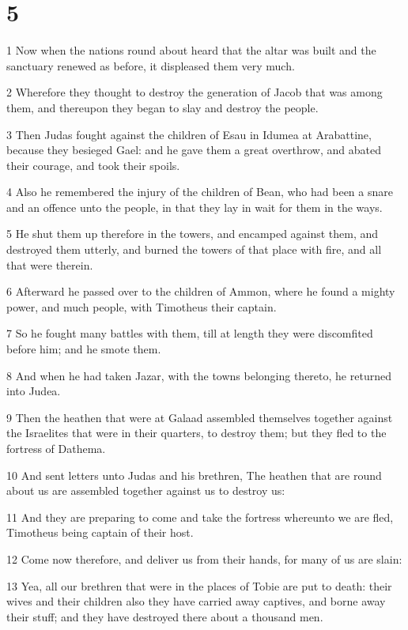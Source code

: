 \chapter{5}

\par 1 Now when the nations round about heard that the altar was built and the sanctuary renewed as before, it displeased them very much.
\par 2 Wherefore they thought to destroy the generation of Jacob that was among them, and thereupon they began to slay and destroy the people.
\par 3 Then Judas fought against the children of Esau in Idumea at Arabattine, because they besieged Gael: and he gave them a great overthrow, and abated their courage, and took their spoils.
\par 4 Also he remembered the injury of the children of Bean, who had been a snare and an offence unto the people, in that they lay in wait for them in the ways.
\par 5 He shut them up therefore in the towers, and encamped against them, and destroyed them utterly, and burned the towers of that place with fire, and all that were therein.
\par 6 Afterward he passed over to the children of Ammon, where he found a mighty power, and much people, with Timotheus their captain.
\par 7 So he fought many battles with them, till at length they were discomfited before him; and he smote them.
\par 8 And when he had taken Jazar, with the towns belonging thereto, he returned into Judea.
\par 9 Then the heathen that were at Galaad assembled themselves together against the Israelites that were in their quarters, to destroy them; but they fled to the fortress of Dathema.
\par 10 And sent letters unto Judas and his brethren, The heathen that are round about us are assembled together against us to destroy us:
\par 11 And they are preparing to come and take the fortress whereunto we are fled, Timotheus being captain of their host.
\par 12 Come now therefore, and deliver us from their hands, for many of us are slain:
\par 13 Yea, all our brethren that were in the places of Tobie are put to death: their wives and their children also they have carried away captives, and borne away their stuff; and they have destroyed there about a thousand men.
